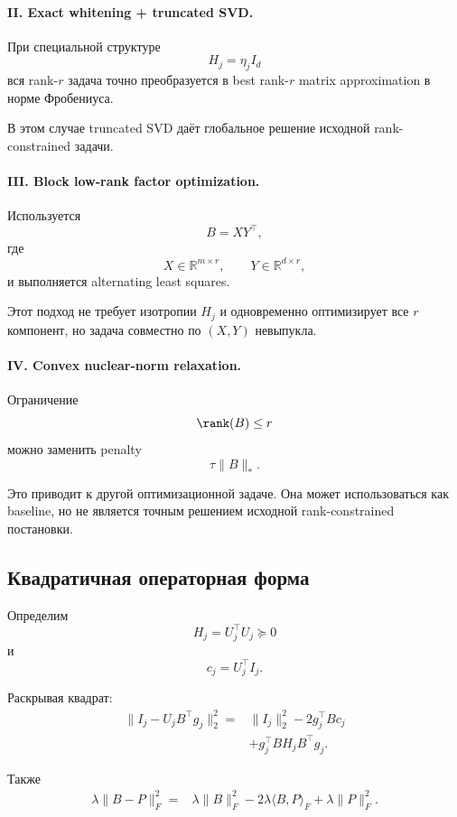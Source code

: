 \paragraph{II. Exact whitening + truncated SVD.}

При специальной структуре
\[
    H_j=\eta_jI_d
\]
вся rank-$r$ задача точно преобразуется в best rank-$r$
matrix approximation в норме Фробениуса.

В этом случае truncated SVD даёт глобальное решение исходной
rank-constrained задачи.

\paragraph{III. Block low-rank factor optimization.}

Используется
\[
    B=XY^\top,
\]
где
\[
    X\in\mathbb R^{m\times r},
    \qquad
    Y\in\mathbb R^{d\times r},
\]
и выполняется alternating least squares.

Этот подход не требует изотропии $H_j$ и одновременно оптимизирует
все $r$ компонент, но задача совместно по $(X,Y)$ невыпукла.

\paragraph{IV. Convex nuclear-norm relaxation.}

Ограничение
\[
    \rank(B)\le r
\]
можно заменить penalty
\[
    \tau\|B\|_*.
\]

Это приводит к другой оптимизационной задаче.
Она может использоваться как baseline, но не является точным
решением исходной rank-constrained постановки.

\subsection{Квадратичная операторная форма}

Определим
\[
    H_j
    =
    U_j^\top U_j
    \succeq0
\]
и
\[
    c_j
    =
    U_j^\top I_j.
\]

Раскрывая квадрат:
\[
\begin{aligned}
    \|I_j-U_jB^\top g_j\|_2^2
    ={}&
    \|I_j\|_2^2
    -
    2g_j^\top Bc_j
    \\
    &+
    g_j^\top BH_jB^\top g_j.
\end{aligned}
\]

Также
\[
\begin{aligned}
    \lambda\|B-P\|_F^2
    ={}&
    \lambda\|B\|_F^2
    -
    2\lambda\langle B,P\rangle_F
    +
    \lambda\|P\|_F^2.
\end{aligned}
\]

